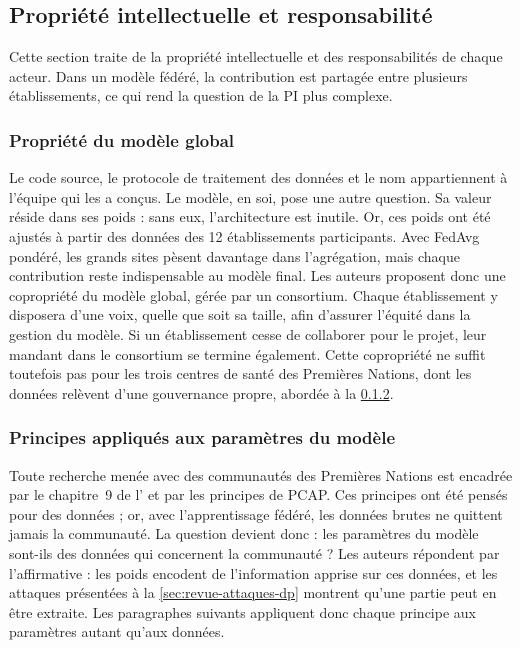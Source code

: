 \subsection{Propriété intellectuelle et responsabilité}
\label{sec:pi-responsabilite}
Cette section traite de la propriété intellectuelle et des responsabilités de chaque acteur.
Dans un modèle fédéré, la contribution est partagée entre plusieurs établissements, ce qui rend la question de la \ac{PI} plus complexe.

\subsubsection{Propriété du modèle global}
\label{sec:propriete-modele}
Le code source, le protocole de traitement des données et le nom \fedesante{} appartiennent à l'équipe qui les a conçus.
Le modèle, en soi, pose une autre question.
Sa valeur réside dans ses poids : sans eux, l'architecture est inutile.
Or, ces poids ont été ajustés à partir des données des 12 établissements participants.
Avec \ac{FedAvg} pondéré, les grands sites pèsent davantage dans l'agrégation, mais chaque contribution reste indispensable au modèle final.
Les auteurs proposent donc une copropriété du modèle global, gérée par un consortium.
Chaque établissement y disposera d'une voix, quelle que soit sa taille, afin d'assurer l'équité dans la gestion du modèle.
Si un établissement cesse de collaborer pour le projet, leur mandant dans le consortium se termine également.
Cette copropriété ne suffit toutefois pas pour les trois centres de santé des Premières Nations, dont les données relèvent d'une gouvernance propre, abordée à la \cref{sec:pcap-parametres}.


\subsubsection{Principes \texorpdfstring{\pcap{}}{PCAP} appliqués aux paramètres du modèle}
\label{sec:pcap-parametres}
Toute recherche menée avec des communautés des Premières Nations est encadrée par le chapitre~9 de l'\eptc{} et par les principes de \ac{PCAP}.
Ces principes ont été pensés pour des données ; or, avec l'apprentissage fédéré, les données brutes ne quittent jamais la communauté.
La question devient donc : les paramètres du modèle sont-ils des données qui concernent la communauté ?
Les auteurs répondent par l'affirmative : les poids encodent de l'information apprise sur ces données, et les attaques présentées à la \cref{sec:revue-attaques-dp} montrent qu'une partie peut en être extraite.
Les paragraphes suivants appliquent donc chaque principe aux paramètres autant qu'aux données.

